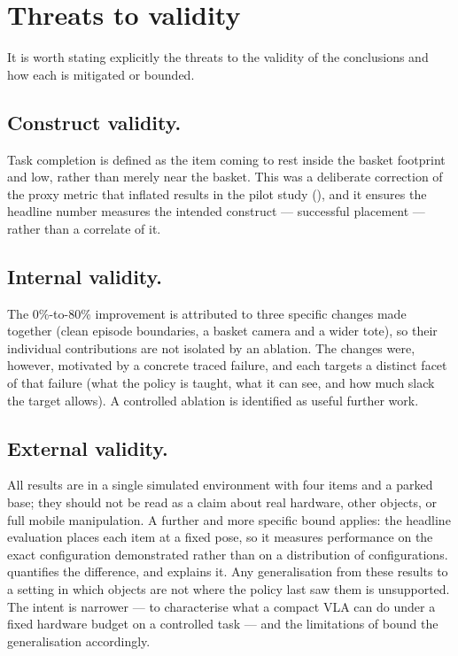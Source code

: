 \section{Threats to validity}
\label{sec:disc-validity}
It is worth stating explicitly the threats to the validity of the conclusions and
how each is mitigated or bounded.

\subsection{Construct validity.} Task completion is defined as the item coming to
rest inside the basket footprint and low, rather than merely near the basket. This
was a deliberate correction of the proxy metric that inflated results in the pilot
study (), and it ensures the headline number measures
the intended construct --- successful placement --- rather than a correlate of it.

\subsection{Internal validity.} The 0\%-to-80\% improvement is attributed to three
specific changes made together (clean episode boundaries, a basket camera and a
wider tote), so their individual contributions are not isolated by an ablation. The
changes were, however, motivated by a concrete traced failure, and each targets a
distinct facet of that failure (what the policy is taught, what it can see, and how
much slack the target allows). A controlled ablation is identified as useful further
work.

\subsection{External validity.} All results are in a single simulated environment
with four items and a parked base; they should not be read as a claim about real
hardware, other objects, or full mobile manipulation. A further and more specific
bound applies: the headline evaluation places each item at a fixed pose, so it
measures performance on the exact configuration demonstrated rather than on a
distribution of configurations.  quantifies the
difference, and  explains it. Any generalisation from these
results to a setting in which objects are not where the policy last saw them is
unsupported. The intent is narrower --- to characterise what a compact VLA can do under
a fixed hardware budget on a controlled task --- and the limitations of
 bound the generalisation accordingly.

